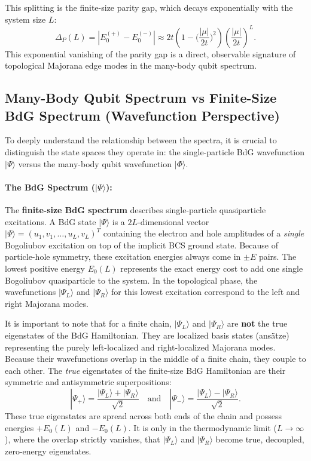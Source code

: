 \documentclass[11pt]{article}
\newcommand{\ket}[1]{|#1\rangle}
\begin{document}
This splitting is the finite-size parity gap, which decays exponentially with the system size $L$:
\begin{equation}
  \Delta_P(L) = |E_0^{(+)} - E_0^{(-)}| \approx 2t \left( 1 - \Big(\frac{|\mu|}{2t}\Big)^{2} \right)\left( \frac{|\mu|}{2t} \right)^L.
\end{equation}
This exponential vanishing of the parity gap is a direct, observable signature of topological Majorana edge modes in the many-body qubit spectrum.

\subsection{Many-Body Qubit Spectrum vs Finite-Size BdG Spectrum (Wavefunction Perspective)}

To deeply understand the relationship between the spectra, it is crucial to distinguish the state spaces they operate in: the single-particle BdG wavefunction $\ket{\Psi}$ versus the many-body qubit wavefunction $\ket{\Phi}$.

\paragraph{The BdG Spectrum ($\ket{\Psi}$):}
The \textbf{finite-size BdG spectrum} describes single-particle quasiparticle excitations. A BdG state $\ket{\Psi}$ is a $2L$-dimensional vector $\ket{\Psi} = (u_1, v_1, \dots, u_L, v_L)^T$ containing the electron and hole amplitudes of a \emph{single} Bogoliubov excitation on top of the implicit BCS ground state. Because of particle-hole symmetry, these excitation energies always come in $\pm E$ pairs. The lowest positive energy $E_0(L)$ represents the exact energy cost to add one single Bogoliubov quasiparticle to the system. In the topological phase, the wavefunctions $\ket{\Psi_L}$ and $\ket{\Psi_R}$ for this lowest excitation correspond to the left and right Majorana modes.

It is important to note that for a finite chain, $\ket{\Psi_L}$ and $\ket{\Psi_R}$ are \textbf{not} the true eigenstates of the BdG Hamiltonian. They are localized basis states (ans\"{a}tze) representing the purely left-localized and right-localized Majorana modes. Because their wavefunctions overlap in the middle of a finite chain, they couple to each other. The \emph{true} eigenstates of the finite-size BdG Hamiltonian are their symmetric and antisymmetric superpositions:
\begin{equation}
  \ket{\Psi_+} = \frac{\ket{\Psi_L} + \ket{\Psi_R}}{\sqrt{2}} \quad \text{and} \quad \ket{\Psi_-} = \frac{\ket{\Psi_L} - \ket{\Psi_R}}{\sqrt{2}}.
\end{equation}
These true eigenstates are spread across both ends of the chain and possess energies $+E_0(L)$ and $-E_0(L)$. It is only in the thermodynamic limit ($L \to \infty$), where the overlap strictly vanishes, that $\ket{\Psi_L}$ and $\ket{\Psi_R}$ become true, decoupled, zero-energy eigenstates.
\end{document}
